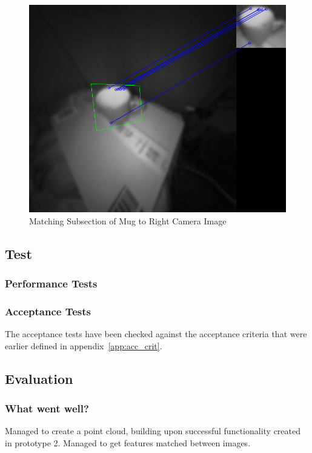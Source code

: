 \documentclass[11pt,oneside]{report}
\begin{document}
			\begin{figure}
			\centering
    				\includegraphics[width=\textwidth]{match_r}
    			\caption{Matching Subsection of Mug to Right Camera Image \protect {\label{fig:match_r}}}

			\end{figure}	
		\subsection{Test}
			\subsubsection{Performance Tests}
			
			\subsubsection{Acceptance Tests}
			The acceptance tests have been checked against the acceptance criteria that were earlier defined in appendix~\ref{app:acc_crit}.
			
		\subsection{Evaluation}
			\subsubsection{What went well?}
			Managed to create a point cloud, building upon successful functionality created in prototype 2.
			Managed to get features matched between images.
\end{document}
